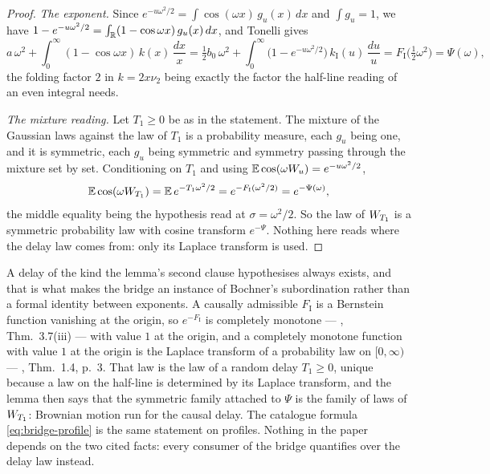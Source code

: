 \begin{proof}
\emph{The exponent.} Since $e^{-u\omega^2/2} = \int\cos(\omega x)\,g_u(x)\,dx$ and
$\int g_u = 1$, we have $1 - e^{-u\omega^2/2} = \int_{\mathbb{R}} (1 - \cos\omega x)\,g_u(x)\,dx$, and
Tonelli gives
\[
  a\,\omega^2 + \int_0^\infty (1 - \cos\omega x)\,k(x)\,\frac{dx}{x}
   = \tfrac12 b_0\,\omega^2
     + \int_0^\infty \bigl(1 - e^{-u\omega^2/2}\bigr)\,k_{\mathrm I}(u)\,\frac{du}{u}
   = F_{\mathrm I}\bigl(\tfrac12\omega^2\bigr) = \Psi(\omega),
\]
the folding factor $2$ in $k = 2x\nu_2$ being exactly the factor the half-line reading of an
even integral needs.

\emph{The mixture reading.} Let $T_1 \ge 0$ be as in the statement. The mixture of the Gaussian
laws against the law of $T_1$ is a probability measure, each $g_u$ being one, and it is
symmetric, each $g_u$ being symmetric and symmetry passing through the mixture set by set.
Conditioning on $T_1$ and using $\mathbb{E}\cos(\omega W_u) = e^{-u\omega^2/2}$,
\[
  \mathbb{E}\cos(\omega W_{T_1}) = \mathbb{E}\,e^{-T_1\omega^2/2}
   = e^{-F_{\mathrm I}(\omega^2/2)} = e^{-\Psi(\omega)},
\]
the middle equality being the hypothesis read at $\sigma = \omega^2/2$. So the law of $W_{T_1}$
is a symmetric probability law with cosine transform $e^{-\Psi}$. Nothing here reads where the
delay law comes from: only its Laplace transform is used.
\end{proof}

\begin{remark}\label{rem:bridge-subordination}
A delay of the kind the lemma's second clause hypothesises always exists, and that is what makes
the bridge an instance of Bochner's subordination rather than a formal identity between
exponents. A causally admissible $F_{\mathrm I}$ is a Bernstein function vanishing at the
origin, so $e^{-F_{\mathrm I}}$ is completely monotone --- ,
Thm.~3.7(iii) --- with value $1$ at the origin, and a completely monotone function with value
$1$ at the origin is the Laplace transform of a probability law on $[0,\infty)$ ---
, Thm.~1.4, p.~3. That law is the law of a random delay
$T_1 \ge 0$, unique because a law on the half-line is determined by its Laplace transform, and
the lemma then says that the symmetric family attached to $\Psi$ is the family of laws of
$W_{T_1}$: Brownian motion run for the causal delay. The catalogue formula \ref{eq:bridge-profile}
is the same statement on profiles. Nothing in the paper depends on the two cited facts: every
consumer of the bridge quantifies over the delay law instead.
\end{remark}

